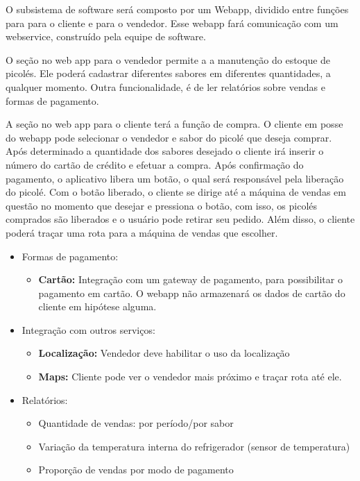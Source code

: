 O subsistema de software será composto por um  Webapp, dividido entre funções para para o cliente e para o vendedor. Esse webapp fará comunicação com um webservice, construído pela equipe de software.

	O seção no web app para o vendedor permite a a manutenção do estoque de picolés. Ele poderá cadastrar diferentes sabores em diferentes quantidades, a qualquer momento. 
    Outra funcionalidade, é de ler relatórios sobre vendas e formas de pagamento.
    
    A seção no web app para o cliente terá a função de compra. O cliente em posse do webapp pode selecionar o vendedor e sabor do picolé que deseja comprar. Após determinado a quantidade dos sabores desejado o cliente irá inserir o número do cartão de crédito e efetuar a compra. Após confirmação do pagamento, o aplicativo libera um botão, o qual será responsável pela liberação do picolé. Com o botão liberado, o cliente se dirige até a máquina de vendas em questão no momento que desejar e pressiona o botão, com isso, os picolés comprados são liberados e o usuário pode retirar seu pedido. Além disso, o cliente poderá traçar uma rota para a máquina de vendas que escolher.

\begin{itemize}
	\item Formas de pagamento:
    \begin{itemize}
        \item \textbf{Cartão:} Integração com um gateway de pagamento, para possibilitar o pagamento em cartão. O webapp não armazenará os dados de cartão do cliente em hipótese alguma.
  	\end{itemize}

	\item Integração com outros serviços:
  	\begin{itemize}
    	\item \textbf{Localização:} Vendedor deve habilitar o uso da localização
    	\item \textbf{Maps:} Cliente pode ver o vendedor mais próximo e traçar rota até ele.
  	\end{itemize}

	\item Relatórios:
  	\begin{itemize}
        \item Quantidade de vendas: por período/por sabor
        \item Variação da temperatura interna do refrigerador (sensor de temperatura)
        \item Proporção de vendas por modo de pagamento
  	\end{itemize}
\end{itemize}


